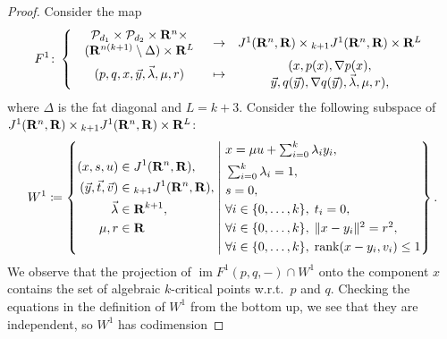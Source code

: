 \begin{proof}
  Consider the map
  \[
    F^1 \colon \left\{ \begin{array}{ccc}
      \begin{array}{c}
        \mathcal{P}_{d_1} \times \mathcal{P}_{d_2} \times \mathbf{R}^n \times \\
        (\mathbf{R}^{n(k + 1)} \setminus \Delta) \times \mathbf{R}^L
      \end{array}
      & \to 
      & J^1(\mathbf{R}^n, \mathbf{R}) \times {}_{k + 1} J^1(\mathbf{R}^n, \mathbf{R}) \times \mathbf{R}^L
    \\
      (p, q, x, \vec{y}, \vec{\lambda}, \mu, r)
      & \mapsto
      & \begin{array}{c}
        (x, p(x), \nabla p(x), \\
        \vec{y}, q(\vec{y}), \nabla q(\vec{y}), \vec{\lambda}, \mu, r),
      \end{array}
    \end{array} \right.
  \]
  where $\Delta$ is the fat diagonal and $L = k + 3$.  Consider the following subspace of $J^1(\mathbf{R}^n, \mathbf{R}) \times {}_{k + 1} J^1(\mathbf{R}^n, \mathbf{R}) \times \mathbf{R}^L$:
  \[
    W^1 \coloneq \left\{
      \begin{aligned}
        (x, s, u) & \in J^1(\mathbf{R}^n, \mathbf{R}), \\
        (\vec{y}, \vec{t}, \vec{v}) & \in {}_{k + 1} J^1(\mathbf{R}^n, \mathbf{R}), \\
        \vec{\lambda} & \in \mathbf{R}^{k + 1}, \\
        \mu, r & \in \mathbf{R}
      \end{aligned}
      \;\middle|\;
      \begin{aligned}
        & \textstyle x = \mu u + \sum_{i = 0}^k \lambda_i y_i, \\
        & \textstyle \sum_{i = 0}^k \lambda_i = 1, \\
        & \textstyle s = 0, \\
        & \textstyle \forall i \in \{0, \ldots, k\}, \; t_i = 0, \\
        & \textstyle \forall i \in \{0, \ldots, k\}, \; \| x - y_i \|^2 = r^2, \\
        & \textstyle \forall i \in \{0, \ldots, k\}, \; \textnormal{rank}(x - y_i, v_i) \leq 1
      \end{aligned}
    \right\}.
  \]
  We observe that the projection of $\operatorname{im} F^1(p, q, -) \cap W^1$ onto the component $x$ contains the set of algebraic $k$-critical points w.r.t.\ $p$ and $q$. Checking the equations in the definition of $W^1$ from the bottom up, we see that they are independent, so $W^1$ has codimension

\end{proof}
